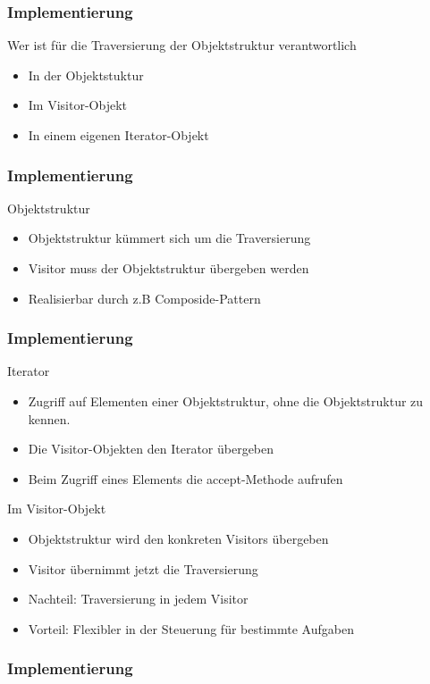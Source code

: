 \begin{frame}
	\frametitle{Implementierung}
  \begin{block}{Wer ist für die Traversierung der Objektstruktur verantwortlich}
  	\begin{itemize}
  		\item In der Objektstuktur
  		\item Im Visitor-Objekt
  		\item In einem eigenen Iterator-Objekt
  	\end{itemize}
  \end{block}
\end{frame}


\begin{frame}
	\frametitle{Implementierung}
  \begin{block}{Objektstruktur}
  	\begin{itemize}
  		\item Objektstruktur kümmert sich um die Traversierung 
  		\item Visitor muss der Objektstruktur übergeben werden
  		\item Realisierbar durch z.B Composide-Pattern
  	\end{itemize}
  \end{block}
\end{frame}

\begin{frame}
	\frametitle{Implementierung}
  \begin{block}{Iterator}
  	\begin{itemize}
  		\item Zugriff auf Elementen einer Objektstruktur, ohne die  Objektstruktur zu kennen.
  		\item Die Visitor-Objekten den Iterator übergeben
  		\item Beim Zugriff eines Elements die accept-Methode aufrufen

  	\end{itemize}
  \end{block}
	\begin{block}{Im Visitor-Objekt}
  	\begin{itemize}
  		\item Objektstruktur wird den konkreten Visitors übergeben
  		\item Visitor übernimmt jetzt die Traversierung
  		\item Nachteil: Traversierung in jedem Visitor
  		\item Vorteil: Flexibler in der Steuerung für bestimmte Aufgaben

  	\end{itemize}
  \end{block}
\end{frame}


\begin{frame}
	\frametitle{Implementierung}

\end{frame}